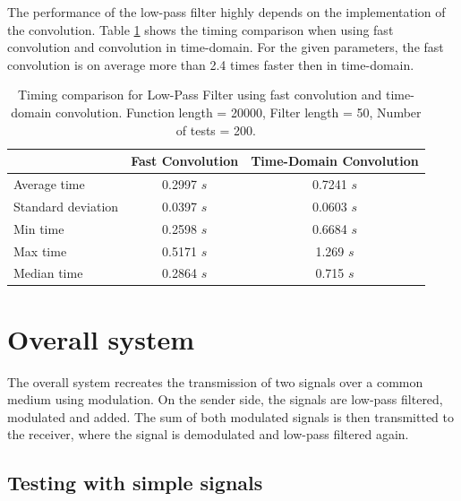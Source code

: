 \documentclass[12pt, a4paper]{report}
\begin{document}
The performance of the low-pass filter highly depends on the implementation of the convolution.
Table \ref{tab:timing_comparison} shows the timing comparison when using fast convolution and convolution in time-domain.
For the given parameters, the fast convolution is on average more than 2.4 times faster then in time-domain.
\begin{table}[h!]
	\centering
	\begin{tabular}{|l|c|c|}
		\hline
		                   & \textbf{Fast Convolution} & \textbf{Time-Domain Convolution} \\ \hline
		Average time       & 0.2997 \(s\)              & 0.7241 \(s\)                     \\ \hline
		Standard deviation & 0.0397 \(s\)              & 0.0603 \(s\)                     \\ \hline
		Min time           & 0.2598 \(s\)              & 0.6684 \(s\)                     \\ \hline
		Max time           & 0.5171 \(s\)              & 1.269 \(s\)                      \\ \hline
		Median time        & 0.2864 \(s\)              & 0.715 \(s\)                      \\ \hline
	\end{tabular}
	\caption{Timing comparison for Low-Pass Filter using fast convolution and time-domain convolution. Function length = 20000, Filter length = 50, Number of tests = 200.}
	\label{tab:timing_comparison}
\end{table}

\chapter{Overall system}

The overall system recreates the transmission of two signals over a common medium using modulation.
On the sender side, the signals are low-pass filtered, modulated and added.
The sum of both modulated signals is then transmitted to the receiver,
where the signal is demodulated and low-pass filtered again.

\section{Testing with simple signals}
\end{document}
